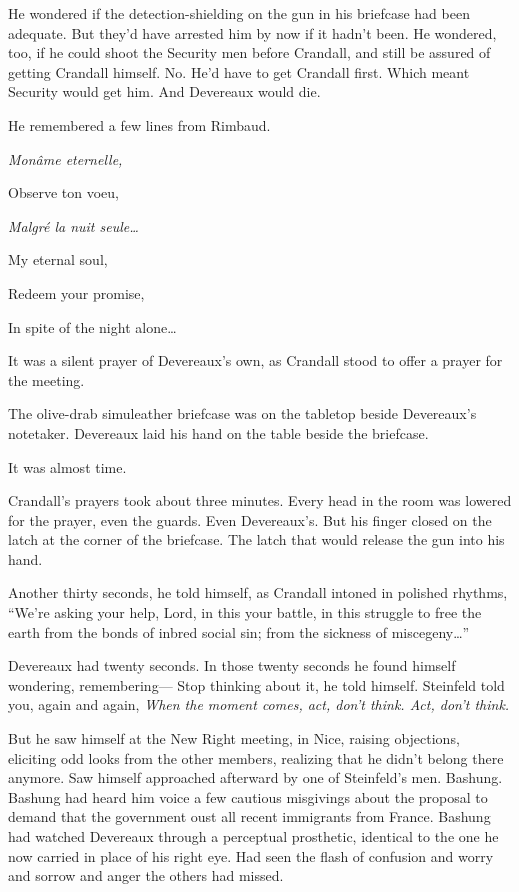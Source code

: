 He wondered if the detection-shielding on the gun in his briefcase had been adequate. But they'd have arrested him by now if it hadn't been. He wondered, too, if he could shoot the Security men before Crandall, and still be assured of getting Crandall himself. No. He'd have to get Crandall first. Which meant Security would get him. And Devereaux would die.

He remembered a few lines from Rimbaud.

\textit{Monâme eternelle,}

Observe ton voeu,

\textit{Malgré la nuit seule\ldots}

My eternal soul,

Redeem your promise,

In spite of the night alone\ldots

It was a silent prayer of Devereaux's own, as Crandall stood to offer a prayer for the meeting.

The olive-drab simuleather briefcase was on the tabletop beside Devereaux's notetaker. Devereaux laid his hand on the table beside the briefcase.

It was almost time.

Crandall's prayers took about three minutes. Every head in the room was lowered for the prayer, even the guards. Even Devereaux's. But his finger closed on the latch at the corner of the briefcase. The latch that would release the gun into his hand.

Another thirty seconds, he told himself, as Crandall intoned in polished rhythms, ``We're asking your help, Lord, in this your battle, in this struggle to free the earth from the bonds of inbred social sin; from the sickness of miscegeny\ldots ''

Devereaux had twenty seconds. In those twenty seconds he found himself wondering, remembering--- Stop thinking about it, he told himself. Steinfeld told you, again and again, \textit{When the moment comes, act, don't think. Act, don't think.}

But he saw himself at the New Right meeting, in Nice, raising objections, eliciting odd looks from the other members, realizing that he didn't belong there anymore. Saw himself approached afterward by one of Steinfeld's men. Bashung. Bashung had heard him voice a few cautious misgivings about the proposal to demand that the government oust all recent immigrants from France. Bashung had watched Devereaux through a perceptual prosthetic, identical to the one he now carried in place of his right eye. Had seen the flash of confusion and worry and sorrow and anger the others had missed.


